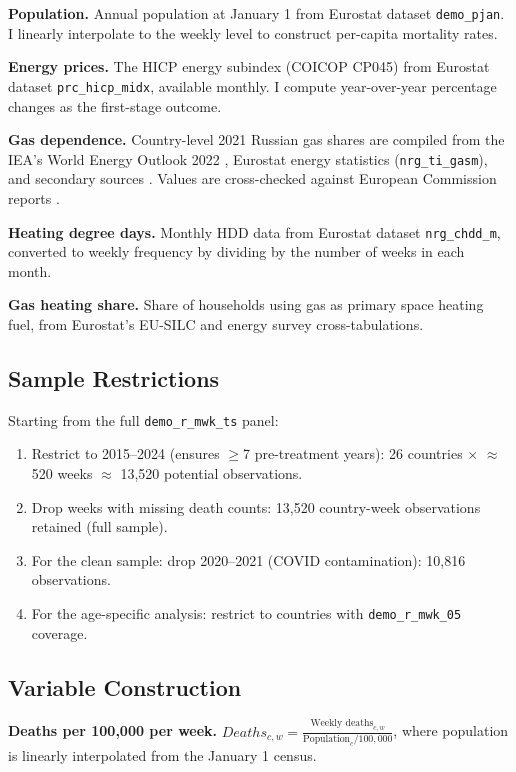\documentclass[12pt]{article}
\begin{document}
\textbf{Population.} Annual population at January 1 from Eurostat dataset \texttt{demo\_pjan}. I linearly interpolate to the weekly level to construct per-capita mortality rates.

\textbf{Energy prices.} The HICP energy subindex (COICOP CP045) from Eurostat dataset \texttt{prc\_hicp\_midx}, available monthly. I compute year-over-year percentage changes as the first-stage outcome.

\textbf{Gas dependence.} Country-level 2021 Russian gas shares are compiled from the IEA's World Energy Outlook 2022 \citep{iea2022}, Eurostat energy statistics (\texttt{nrg\_ti\_gasm}), and secondary sources \citep{stern2022}. Values are cross-checked against European Commission reports \citep{eurocomm2023}.

\textbf{Heating degree days.} Monthly HDD data from Eurostat dataset \texttt{nrg\_chdd\_m}, converted to weekly frequency by dividing by the number of weeks in each month.

\textbf{Gas heating share.} Share of households using gas as primary space heating fuel, from Eurostat's EU-SILC and energy survey cross-tabulations.

\subsection{Sample Restrictions}

Starting from the full \texttt{demo\_r\_mwk\_ts} panel:
\begin{enumerate}
\item Restrict to 2015--2024 (ensures $\geq$7 pre-treatment years): 26 countries $\times$ $\approx$520 weeks $\approx$ 13,520 potential observations.
\item Drop weeks with missing death counts: 13,520 country-week observations retained (full sample).
\item For the clean sample: drop 2020--2021 (COVID contamination): 10,816 observations.
\item For the age-specific analysis: restrict to countries with \texttt{demo\_r\_mwk\_05} coverage.
\end{enumerate}

\subsection{Variable Construction}

\textbf{Deaths per 100,000 per week.} $Deaths_{c,w} = \frac{\text{Weekly deaths}_{c,w}}{\text{Population}_c / 100{,}000}$, where population is linearly interpolated from the January 1 census.
\end{document}
